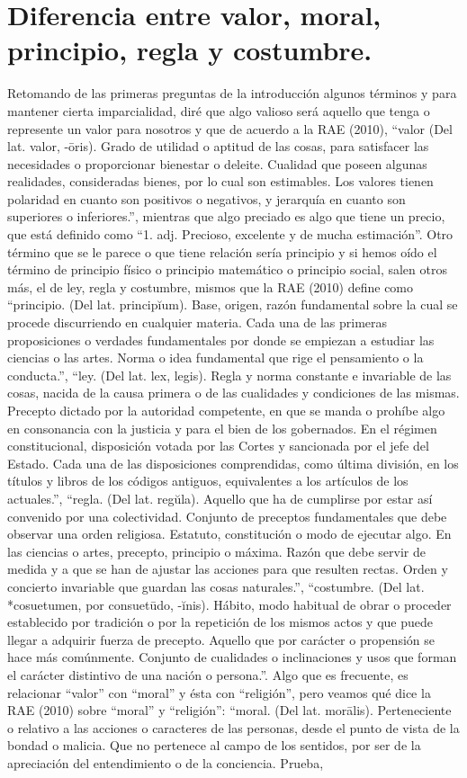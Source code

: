 \documentclass[12pt]{book} %
\begin{document}
\section{Diferencia entre valor, moral, principio, regla y costumbre.}
Retomando de las primeras preguntas de la introducción algunos términos y para mantener cierta imparcialidad, diré que algo valioso será aquello que tenga o represente un valor para nosotros y que de acuerdo a la RAE (2010), “valor (Del lat. valor, -ōris). Grado de utilidad o aptitud de las cosas, para satisfacer las necesidades o proporcionar bienestar o deleite. Cualidad que poseen algunas realidades, consideradas bienes, por lo cual son estimables. Los valores tienen polaridad en cuanto son positivos o negativos, y jerarquía en cuanto son superiores o inferiores.”, mientras que algo preciado es algo que tiene un precio, que está definido como “1. adj. Precioso, excelente y de mucha estimación”. Otro término que se le parece o que tiene relación sería principio y si hemos oído el término de principio físico o principio matemático o principio social, salen otros más, el de ley, regla y costumbre, mismos que la RAE (2010) define como “principio. (Del lat. principĭum). Base, origen, razón fundamental sobre la cual se procede discurriendo en cualquier materia. Cada una de las primeras proposiciones o verdades fundamentales por donde se empiezan a estudiar las ciencias o las artes. Norma o idea fundamental que rige el pensamiento o la conducta.”, “ley. (Del lat. lex, legis). Regla y norma constante e invariable de las cosas, nacida de la causa primera o de las cualidades y condiciones de las mismas. Precepto dictado por la autoridad competente, en que se manda o prohíbe algo en consonancia con la justicia y para el bien de los gobernados. En el régimen constitucional, disposición votada por las Cortes y sancionada por el jefe del Estado. Cada una de las disposiciones comprendidas, como última división, en los títulos y libros de los códigos antiguos, equivalentes a los artículos de los actuales.”, “regla. (Del lat. regŭla). Aquello que ha de cumplirse por estar así convenido por una colectividad. Conjunto de preceptos fundamentales que debe observar una orden religiosa. Estatuto, constitución o modo de ejecutar algo. En las ciencias o artes, precepto, principio o máxima. Razón que debe servir de medida y a que se han de ajustar las acciones para que resulten rectas. Orden y concierto invariable que guardan las cosas naturales.”, “costumbre. (Del lat. *cosuetumen, por consuetūdo, -ĭnis). Hábito, modo habitual de obrar o proceder establecido por tradición o por la repetición de los mismos actos y que puede llegar a adquirir fuerza de precepto. Aquello que por carácter o propensión se hace más comúnmente. Conjunto de cualidades o inclinaciones y usos que forman el carácter distintivo de una nación o persona.”. Algo que es frecuente, es relacionar “valor” con “moral” y ésta con “religión”, pero veamos qué dice la RAE (2010) sobre “moral” y “religión”: “moral. (Del lat. morālis). Perteneciente o relativo a las acciones o caracteres de las personas, desde el punto de vista de la bondad o malicia. Que no pertenece al campo de los sentidos, por ser de la apreciación del entendimiento o de la conciencia. Prueba, 
\end{document}
